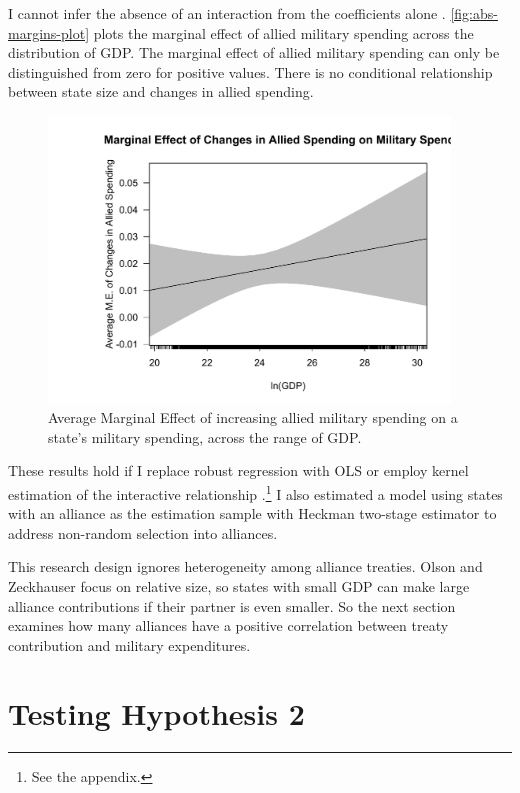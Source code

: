 \documentclass[12pt]{article}
\begin{document}
I cannot infer the absence of an interaction from the coefficients alone \citep{BramborClarkGolder2006}. 
\autoref{fig:abs-margins-plot} plots the marginal effect of allied military spending across the distribution of GDP. 
The marginal effect of allied military spending can only be distinguished from zero for positive values. 
There is no conditional relationship between state size and changes in allied spending. 


\begin{figure}
	\centering
		\includegraphics[width=0.95\textwidth]{abs-margins-plot.pdf}
	\caption{Average Marginal Effect of increasing allied military spending on a state's military spending, across the range of GDP.}
		\label{fig:abs-margins-plot}
\end{figure}


These results hold if I replace robust regression with OLS or employ kernel estimation of the interactive relationship \citep{Hainmuelleretal2019}.\footnote{See the appendix.} 
I also estimated a model using states with an alliance as the estimation sample with Heckman two-stage estimator to address non-random selection into alliances. 


This research design ignores heterogeneity among alliance treaties.
Olson and Zeckhauser focus on relative size, so states with small GDP can make large alliance contributions if their partner is even smaller. 
So the next section examines how many alliances have a positive correlation between treaty contribution and military expenditures. 


\section{Testing Hypothesis 2}
\end{document}
